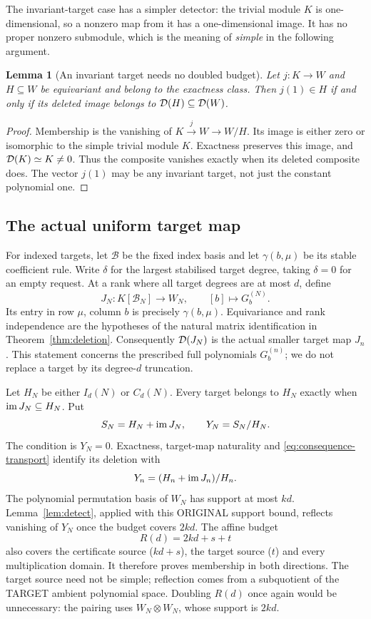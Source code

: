 \documentclass[11pt,a4paper]{article}
\newtheorem{lemma}[theorem]{Lemma}
\theoremstyle{definition}\newtheorem{definition}[theorem]{Definition}
\theoremstyle{remark}\newtheorem{remark}[theorem]{Remark}
\begin{document}
The invariant-target case has a simpler detector: the trivial module
$K$ is one-dimensional, so a nonzero map from it has a one-dimensional
image. It has no proper nonzero submodule, which is the meaning of
\emph{simple} in the following argument.

\begin{lemma}[An invariant target needs no doubled budget]\label{lem:constant}
Let $j:K\to W$ and $H\subseteq W$ be equivariant and belong to the
exactness class. Then $j(1)\in H$ if and only if its deleted image
belongs to $\mathcal D(H)\subseteq\mathcal D(W)$.
\end{lemma}
\begin{proof}
Membership is the vanishing of $K\xrightarrow{j}W\to W/H$.
Its image is either zero or isomorphic to the simple trivial module
$K$. Exactness preserves this image, and $\mathcal D(K)\simeq K\ne0$.
Thus the composite vanishes exactly when its deleted composite does.
The vector $j(1)$ may be any invariant target, not just the constant
polynomial one.
\end{proof}

\subsection{The actual uniform target map}\label{sec:target-transfer}
For indexed targets, let $\mathcal B$ be the fixed index basis and
let $\gamma(b,\mu)$ be its stable coefficient rule. Write $\delta$ for the largest stabilised target degree, taking
$\delta=0$ for an empty request. At a rank where
all target degrees are at most $d$, define
\[
 J_N:K[\mathcal B_N]\longrightarrow W_N,\qquad
                [b]\longmapsto G_b^{(N)}.
\]
Its entry in row $\mu$, column $b$ is precisely $\gamma(b,\mu)$.
Equivariance and rank independence are the hypotheses of the natural
matrix identification in Theorem~\ref{thm:deletion}. Consequently
$\mathcal D(J_N)$ is the actual smaller target map $J_n$.
This statement concerns the prescribed full polynomials $G_b^{(n)}$;
we do not replace a target by its degree-$d$ truncation.

Let $H_N$ be either $I_d(N)$ or $C_d(N)$. Every target belongs to
$H_N$ exactly when $\operatorname{im} J_N\subseteq H_N$. Put
\[
          S_N=H_N+\operatorname{im} J_N,\qquad Y_N=S_N/H_N.
\]
The condition is $Y_N=0$. Exactness, target-map naturality and
\eqref{eq:consequence-transport} identify its deletion with
\[
          Y_n=(H_n+\operatorname{im} J_n)/H_n.
\]
The polynomial permutation basis of $W_N$ has support at most $kd$.
Lemma~\ref{lem:detect}, applied with this ORIGINAL support bound,
reflects vanishing of $Y_N$ once the budget covers $2kd$.
The affine budget
\[
                            R(d)=2kd+s+t
\]
also covers the certificate source ($kd+s$), the target source ($t$)
and every multiplication domain. It therefore proves membership in
both directions. The target source need not be simple; reflection
comes from a subquotient of the TARGET ambient polynomial space.
Doubling $R(d)$ once again would be unnecessary: the pairing uses
$W_N\otimes W_N$, whose support is $2kd$.
\end{document}
